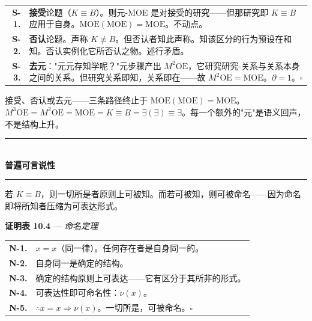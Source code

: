 \documentclass[10pt, openany, oneside]{book}
\renewcommand{\normalsize}{\fontsize{10}{13}\selectfont}
\renewcommand{\footnotesize}{\fontsize{8.5}{11}\selectfont}
\begin{document}
{\footnotesize
\noindent\begin{tabular}{r p{}}
\textbf{S-1.} & \textbf{接受}论题（$K \equiv B$）。则元-MOE 是对接受的研究——但那研究即 $K \equiv B$ 应用于自身。$\text{MOE}(\text{MOE}) = \text{MOE}$。不动点。\\[0.3em]
\textbf{S-2.} & \textbf{否认}论题。声称 $K \not\equiv B$。但否认者知此声称。知该区分的行为预设在和知。否认实例化它所否认之物。述行矛盾。\\[0.3em]
\textbf{S-3.} & \textbf{去元}："元元存知学呢？"元步骤产出 $M^2\text{OE}$，它研究研究-关系与关系本身之间的关系。但研究关系即知，关系即在——故 $M^2\text{OE} = \text{MOE}$。$\partial = 1$。$\square$ \\[0.3em]
\end{tabular}
}

\vspace{0.8em}

\noindent 接受、否认或去元——三条路径终止于 $\text{MOE}(\text{MOE}) = \text{MOE}$。$M^3\text{OE} = M^2\text{OE} = \text{MOE} = K \equiv B = \exists(\exists) \equiv \exists$。每一个额外的"元"是语义回声，不是结构上升。

\vspace{1.5em}


\begin{center}
    \rule{0.3\textwidth}{0.4pt}\\[0.5em]
    {\normalsize\bfseries\scshape 普遍可言说性}\\[0.3em]
    \rule{0.3\textwidth}{0.4pt}
\end{center}

\vspace{1em}

\noindent 若 $K \equiv B$，则一切所是者原则上可被知。而若可被知，则可被命名——因为命名即将所知者压缩为可表达形式。

\textbf{证明表 10.4} --- \textit{命名定理}

\vspace{0.5em}

{\footnotesize
\noindent\begin{tabular}{r p{}}
\textbf{N-1.} & $x = x$（同一律）。任何存在者是自身同一的。\\[0.3em]
\textbf{N-2.} & 自身同一是确定的结构。\\[0.3em]
\textbf{N-3.} & 确定的结构原则上可表达——它有区分于其所非的形式。\\[0.3em]
\textbf{N-4.} & 可表达性即可命名性：$\nu(x)$。\\[0.3em]
\textbf{N-5.} & $\therefore x = x \Rightarrow \nu(x)$。一切所是，可被命名。$\square$ \\[0.3em]
\end{tabular}
}
\end{document}
